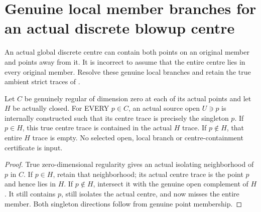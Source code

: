 \section{Genuine local member branches for an actual discrete blowup centre}

An actual global discrete centre can contain both points on an original
member and points away from it. It is incorrect to assume that the entire
centre lies in every original member. Resolve these genuine local branches
and retain the true ambient strict traces of
\cite[Remark~12.6, pp.~293--295]{bierstone-milman97-invent-math}.

\begin{lemma}
\label{hir:sharp-actual-discrete-centre-member-source-open-branches}
\leanok
Let $C$ be genuinely regular of dimension zero at each of its actual
points and let $H$ be actually closed. For EVERY $p\in C$, an actual
source open $U\ni p$ is internally constructed such that its centre trace
is precisely the singleton $p$. If $p\in H$, this true centre trace is
contained in the actual $H$ trace. If $p\notin H$, that entire $H$ trace
is empty. No selected open, local branch or centre-containment certificate
is input.
\end{lemma}
\begin{proof}
True zero-dimensional regularity gives an actual isolating neighborhood
of $p$ in $C$. If $p\in H$, retain that neighborhood; its actual centre
trace is the point $p$ and hence lies in $H$. If $p\notin H$, intersect
it with the genuine open complement of $H$. It still contains $p$,
still isolates the actual centre, and now misses the entire member.
Both singleton directions follow from genuine point membership.
\end{proof}

